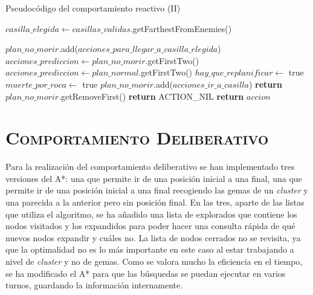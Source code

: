 \documentclass[11pt,a4paper]{article}
\begin{document}
\begin{algorithm}[H]
\caption{Pseudocódigo del comportamiento reactivo (II)}
\begin{algorithmic}
			\State $casilla\_elegida \gets casillas\_validas$.getFarthestFromEnemies()
		\EndIf
		
		\State $plan\_no\_morir$.add($acciones\_para\_llegar\_a\_casilla\_elegida$)
	\EndIf	
\EndIf
{}
	\State $acciones\_prediccion \gets plan\_no\_morir$.getFirstTwo()
\Else
	\State $acciones\_prediccion \gets plan\_normal$.getFirstTwo()
\EndIf
{}
	\State $hay\_que\_replanificar \gets $ true
		\State $muerte\_por\_roca \gets$ true
	\EndIf
				\State $plan\_no\_morir$.add($acciones\_ir\_a\_casilla$)
			\EndIf
		\EndFor
	\EndIf
\EndIf
{}
	\State \textbf{return} $plan\_no\_morir$.getRemoveFirst()
\EndIf
{}
	\State {}
		\State {}
			\State \textbf{return} ACTION\_NIL
		\EndIf
	\EndIf
\EndIf
\State \textbf{return} $accion$ 
\EndProcedure
\end{algorithmic}
\end{algorithm}

\newpage

\section{\textsc{Comportamiento Deliberativo}}

Para la realización del comportamiento deliberativo se han implementado tres versiones del A*: una
que permite ir de una posición inicial a una final, una que permite ir de una posición inicial a
una final recogiendo las gemas de un \textit{cluster} y una parecida a la anterior pero sin posición
final. En las tres, aparte de las listas que utiliza el algoritmo, se ha añadido una lista de explorados
que contiene los nodos visitados y los expandidos para poder hacer una consulta rápida de qué nuevos
nodos expandir y cuáles no. La lista de nodos cerrados no se revisita, ya que la optimalidad no es lo más
importante en este caso al estar trabajando a nivel de \textit{cluster} y no de gemas. Como se valora
mucho la eficiencia en el tiempo, se ha modificado el A* para que las búsquedas se puedan ejecutar en
varios turnos, guardando la información internamente.
\end{document}
